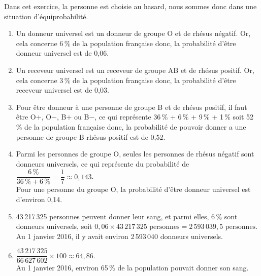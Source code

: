 \begin{corrige}
   Dans cet exercice, la personne est choisie au hasard, nous sommes donc dans une situation d'équiprobabilité.
   \begin{enumerate}
      \item Un donneur universel est un donneur de groupe O et de rhésus négatif. Or, cela concerne 6\,\% de la population française donc, {\blue la probabilité d'être donneur universel est de 0,06.}
      \item Un receveur universel est un receveur de groupe AB et de rhésus positif. Or, cela concerne 3\,\% de la population française donc, {\blue la probabilité d'être receveur universel est de 0,03.}
      \item Pour être donneur à une personne de groupe B et de rhésus positif, il faut être O$+$, O$-$, B$+$ ou B$-$, ce qui représente 36\,\% + 6\,\% + 9\,\% + 1\,\% soit 52\,\% de la population française donc, {\blue la probabilité de pouvoir donner a une personne de groupe B rhésus positif est de 0,52.}
      \item Parmi les personnes de groupe O, seules les personnes de rhésus négatif sont donneurs universels, ce qui représente du probabilité de $\dfrac{6\,\%}{36\,\%+6\,\%} =\dfrac17 \approx 0,143$. \\ [2mm]
         {\blue Pour une personne du groupe O, la probabilité d'être donneur universel est d'environ 0,14.}
      \item 43\,217\,325 personnes peuvent donner leur sang, et parmi elles, 6\,\% sont donneurs universels, soit $0,06\times43\,217\,325\text{ personnes} =2\,593\,039,5\text{ personnes}$. \\
         {\blue Au 1 janvier 2016, il y avait environ 2\,593\,040 donneurs universels.} \\ [2mm]
      \item $\dfrac{43\,217\,325}{66\,627\,602}\times100 \approx64,86.$ \\ [2mm]
         {\blue Au 1 janvier 2016, environ 65\,\% de la population pouvait donner son sang.}
   \end{enumerate}
\end{corrige}


